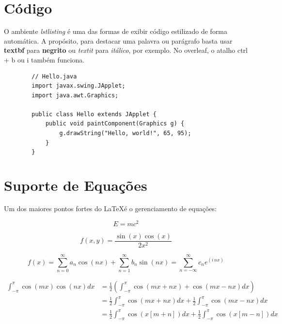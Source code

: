\documentclass{article}
\begin{document}
\section{Código}

    O ambiente \textit{lstlisting} é uma das formas de exibir código estilizado de forma automática. A propósito, para destacar uma palavra ou parágrafo basta usar \textbf{textbf} para \textbf{negrito} ou \textit{textit} para \textit{itálico}, por exemplo. No overleaf, o atalho ctrl + b ou i também funciona.

    \begin{lstlisting}
        // Hello.java
        import javax.swing.JApplet;
        import java.awt.Graphics;
        
        public class Hello extends JApplet {
            public void paintComponent(Graphics g) {
                g.drawString("Hello, world!", 65, 95);
            }    
        }
    \end{lstlisting}
    
    \section{Suporte de Equações}
    
    
    Um dos maiores pontos fortes do \LaTeX é o gerenciamento de equações:
    
    
    \begin{equation}\label{eq:einstein}
    E = m c^2
    \end{equation}
    
  
    
    \begin{equation}
        f(x,y) = \frac{\sin(x)\cos(x)}{2x^2}
    \end{equation}
    
    \begin{equation}\label{eqfourier}
        f(x) = \sum_{n=0}^{\infty} a_n \cos (nx) + \sum_{n=1}^{\infty} b_n \sin(nx) = \sum_{n =-\infty}^{\infty} c_n e^{(i \,nx)} 
    \end{equation}


    \begin{equation}
    \begin{split}
    \int_{-\pi}^{\pi} \cos(mx) \cos (nx) dx &= \frac{1}{2} \left (\int_{-\pi}^{\pi} \cos(mx+nx) + \cos(mx-nx) dx \right )\\
    &= \frac{1}{2}\int_{-\pi}^{\pi} \cos(mx+nx) dx + \frac{1}{2}\int_{-\pi}^{\pi} \cos(mx-nx) dx\\
    &= \frac{1}{2}\int_{-\pi}^{\pi} \cos( x[m+n] ) dx + \frac{1}{2}\int_{-\pi}^{\pi} \cos(x[m-n]) dx
    \end{split}
    \end{equation}
    
\end{document}
